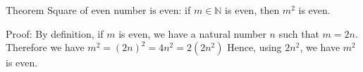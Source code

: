 Theorem Square of even number is even: 
if $m \in \mathbb{N}$ is even, then $m^2$ is even.


Proof:
By definition, if $m$ is even, we have a natural number $n$ such that $m = 2n$.
Therefore we have $m^2 = (2n)^2 = 4n^2 = 2(2n^2)$
Hence, using $2n^2$, we have $m^2$ is even.